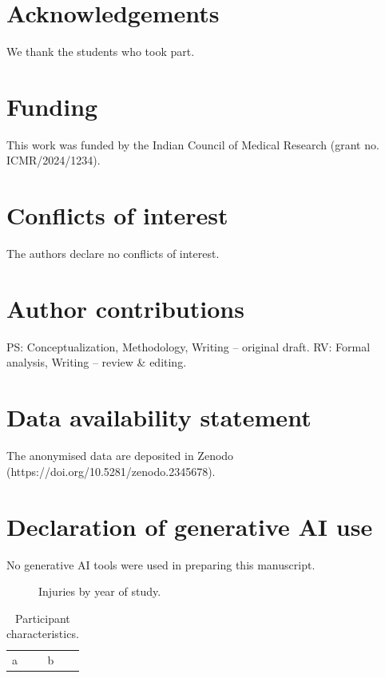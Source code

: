\documentclass{article}
\begin{document}
\section{Acknowledgements}
We thank the students who took part.
\section{Funding}
This work was funded by the Indian Council of Medical Research (grant no. ICMR/2024/1234).
\section{Conflicts of interest}
The authors declare no conflicts of interest.
\section{Author contributions}
PS: Conceptualization, Methodology, Writing -- original draft. RV: Formal analysis, Writing -- review \& editing.
\section{Data availability statement}
The anonymised data are deposited in Zenodo (https://doi.org/10.5281/zenodo.2345678).
\section{Declaration of generative AI use}
No generative AI tools were used in preparing this manuscript.

\begin{figure}\caption{Injuries by year of study.}\label{fig:inj}\end{figure}
\begin{table}\caption{Participant characteristics.}\label{tab:inj}\begin{tabular}{ll}a & b\end{tabular}\end{table}


\end{document}
